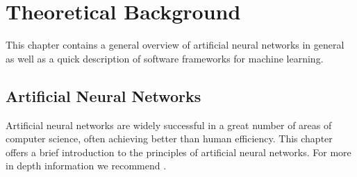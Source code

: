 \chapter{Theoretical Background}
\label{sec:chap2}
This chapter contains a general overview of artificial neural networks in general as well as a quick description of software frameworks for machine learning.

\section{Artificial Neural Networks}
Artificial neural networks are widely successful in a great number of areas of computer science, often achieving better than human efficiency. This chapter offers a brief introduction to the principles of artificial neural networks. For more in depth information we recommend \cite{goodfellow_deep_2016}.


